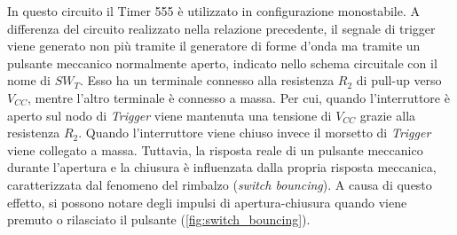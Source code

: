 \noindent
In questo circuito il Timer 555 è utilizzato in configurazione monostabile. A differenza del circuito realizzato nella relazione precedente, il segnale di trigger viene generato non più tramite il generatore di forme d'onda ma tramite un pulsante meccanico normalmente aperto, indicato nello schema circuitale con il nome di $SW_{T}$. 
Esso ha un terminale connesso alla resistenza $R_2$ di pull-up verso $V_{CC}$, mentre l'altro terminale è connesso a massa. Per cui, quando l'interruttore è aperto sul nodo di \textit{Trigger} viene mantenuta una tensione di $V_{CC}$ grazie alla resistenza $R_2$. Quando l'interruttore viene chiuso invece il morsetto di \textit{Trigger} viene collegato a massa. Tuttavia, la risposta reale di un pulsante meccanico durante l'apertura e la chiusura è influenzata dalla propria risposta meccanica, caratterizzata dal fenomeno del rimbalzo (\textit{switch bouncing}). A causa di questo effetto, si possono notare degli impulsi di apertura-chiusura quando viene premuto o rilasciato il pulsante (\Fig\ref{fig:switch_bouncing}).
